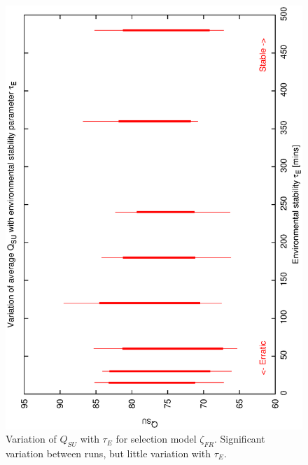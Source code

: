\begin{figure}[h]
\begin{center}
 \includegraphics[scale=0.5, angle=-90]{figures/biasfr_de.eps}
 \caption[Variation of $Q_{SU}$ with $\tau_E$ for selection model $\zeta_{FR}$.] 
   {Variation of $Q_{SU}$ with $\tau_E$ for selection model $\zeta_{FR}$. Significant variation between runs, but little variation with $\tau_E$.}
\label{fig:qsu_de_biasfr}
\end{center} 
\end{figure}

